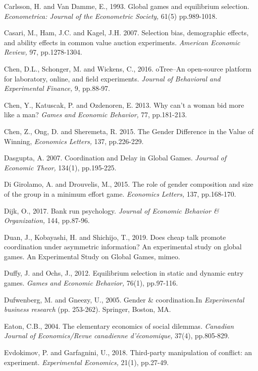 \documentclass[11pt, letterpaper]{article}
\theoremstyle{plain}
\begin{document}
\begin{thebibliography}{10}
\bibitem{} Carlsson, H. and Van Damme, E., 1993. Global games and equilibrium selection. \textit{Econometrica: Journal of the Econometric Society,} 61(5) pp.989-1018.

\bibitem{} Casari, M., Ham, J.C. and Kagel, J.H. 2007. Selection bias, demographic effects, and ability effects in common value auction experiments. \textit{American Economic Review,} 97, pp.1278-1304.

 Chen, D.L., Schonger, M. and Wickens, C., 2016. oTree--An open-source platform for laboratory, online, and field experiments. \textit{Journal of Behavioral and Experimental Finance,} 9, pp.88-97.

 Chen, Y., Katuscak, P. and Ozdenoren, E. 2013. Why can't a woman bid more like a man? \textit{Games and Economic Behavior,} 77, pp.181-213.

 Chen, Z., Ong, D. and Sheremeta, R. 2015. The Gender Difference in the Value of Winning, \textit{Economics Letters,} 137, pp.226-229.

Dasgupta, A. 2007. Coordination and Delay in Global Games. \textit{Journal of Economic Theor,} 134(1), pp.195-225.

 Di Girolamo, A. and Drouvelis, M., 2015. The role of gender composition and size of the group in a minimum effort game. \textit{Economics Letters,} 137, pp.168-170.

 Dijk, O., 2017. Bank run psychology. \textit{Journal of Economic Behavior \& Organization,} 144, pp.87-96.

 Duan, J., Kobayashi, H. and Shichijo, T., 2019. Does cheap talk promote coordination under asymmetric information? An experimental study on global games. An Experimental Study on Global Games, mimeo.

\bibitem{} Duffy, J. and Ochs, J., 2012. Equilibrium selection in static and dynamic entry games. \textit{Games and Economic Behavior,} 76(1), pp.97-116.

\bibitem{} Dufwenberg, M. and Gneezy, U., 2005. Gender \& coordination.In \textit{Experimental business research} (pp. 253-262). Springer, Boston, MA.

\bibitem{}Eaton, C.B., 2004. The elementary economics of social dilemmas. \textit{Canadian Journal of Economics/Revue canadienne d'\'{e}conomique,} 37(4), pp.805-829.

  Evdokimov, P. and Garfagnini, U., 2018. Third-party manipulation of conflict: an experiment. \textit{Experimental Economics,} 21(1), pp.27-49.


\end{thebibliography}
\end{document}
